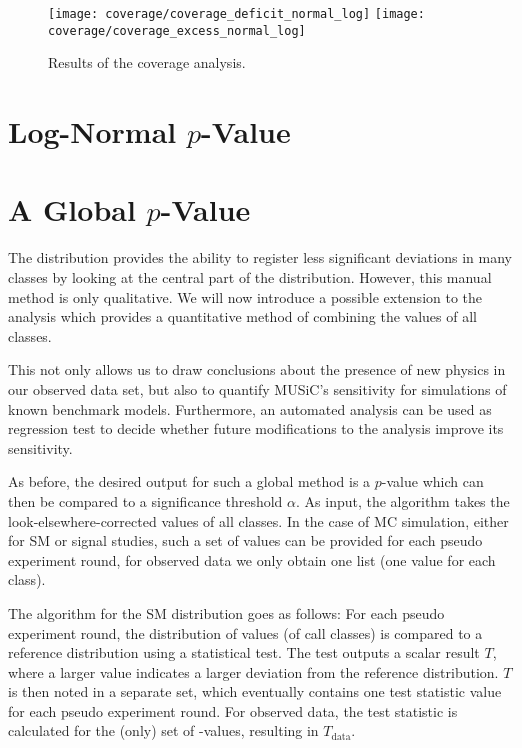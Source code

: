 \begin{figure}
    \texttt{[image: coverage/coverage\_deficit\_normal\_log]}
    \texttt{[image: coverage/coverage\_excess\_normal\_log]}
    \caption{Results of the coverage analysis.}
    \label{fig:coverage2}
\end{figure}


\section{Log-Normal $p$-Value}


\section{A Global $p$-Value}
\newcommand{\TSphat}{\ensuremath{T}\xspace}

The \ptilde distribution provides the ability to register less significant deviations in many classes by looking at the central part of the distribution. However, this manual method is only qualitative. We will now introduce a possible extension to the analysis which provides a quantitative method of combining the \ptilde values of all classes.

This not only allows us to draw conclusions about the presence of new physics in our observed data set, but also to quantify \ac{MUSiC}'s sensitivity for simulations of known benchmark models. Furthermore, an automated analysis can be used as regression test to decide whether future modifications to the analysis improve its sensitivity.

As before, the desired output for such a global method is a $p$-value which can then be compared to a significance threshold $\alpha$.
As input, the algorithm takes the look-elsewhere-corrected \ptilde values of all classes. In the case of \ac{MC} simulation, either for \ac{SM} or signal studies, such a set of \ptilde values can be provided for each pseudo experiment round, for observed data we only obtain one list (one value for each class).

The algorithm for the \ac{SM} distribution goes as follows: For each pseudo experiment round, the distribution of \ptilde values (of call classes) is compared to a reference distribution using a statistical test. The test outputs a scalar result \TSphat, where a larger value indicates a larger deviation from the reference distribution. \TSphat is then noted in a separate set, which eventually contains one test statistic value for each pseudo experiment round.
For observed data, the test statistic is calculated for the (only) set of \ptilde-values, resulting in $\TSphat_\text{data}$.

